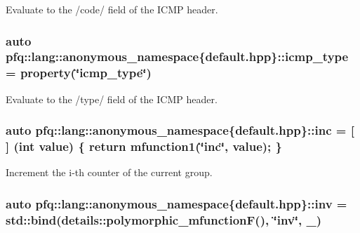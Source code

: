Evaluate to the /code/ field of the I\+C\+M\+P header. 

\hypertarget{namespacepfq_1_1lang_1_1anonymous__namespace_02default_8hpp_03_a0c15abbec8753be8bb160633f697ed4b}{
\subsubsection[{icmp\+\_\+type}]{\setlength{\rightskip}{0pt plus 5cm}auto pfq\+::lang\+::anonymous\+\_\+namespace\{default.\+hpp\}\+::icmp\+\_\+type = {\bf property}(\char`\"{}icmp\+\_\+type\char`\"{})}}\label{namespacepfq_1_1lang_1_1anonymous__namespace_02default_8hpp_03_a0c15abbec8753be8bb160633f697ed4b}


Evaluate to the /type/ field of the I\+C\+M\+P header. 

\hypertarget{namespacepfq_1_1lang_1_1anonymous__namespace_02default_8hpp_03_acc7d3a4cca5eb30ff5456e19c613b174}{
\subsubsection[{inc}]{\setlength{\rightskip}{0pt plus 5cm}auto pfq\+::lang\+::anonymous\+\_\+namespace\{default.\+hpp\}\+::inc = \mbox{[}$\,$\mbox{]} (int value) \{ return {\bf mfunction1}(\char`\"{}inc\char`\"{}, value); \}}}\label{namespacepfq_1_1lang_1_1anonymous__namespace_02default_8hpp_03_acc7d3a4cca5eb30ff5456e19c613b174}


Increment the i-\/th counter of the current group. 

\hypertarget{namespacepfq_1_1lang_1_1anonymous__namespace_02default_8hpp_03_a4e7c9b70d87164407c1dd1100ddd8363}{
\subsubsection[{inv}]{\setlength{\rightskip}{0pt plus 5cm}auto pfq\+::lang\+::anonymous\+\_\+namespace\{default.\+hpp\}\+::inv = std\+::bind(details\+::polymorphic\+\_\+mfunction\+F(), \char`\"{}inv\char`\"{}, \+\_)}}\label{namespacepfq_1_1lang_1_1anonymous__namespace_02default_8hpp_03_a4e7c9b70d87164407c1dd1100ddd8363}


